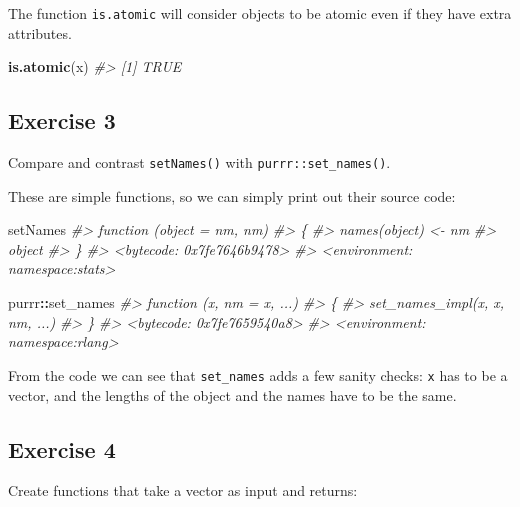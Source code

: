 \documentclass[]{book}
\newenvironment{Shaded}{\begin{snugshade}}{\end{snugshade}}
\newcommand{\CommentTok}[1]{\textcolor[rgb]{0.56,0.35,0.01}{\textit{#1}}}
\newcommand{\KeywordTok}[1]{\textcolor[rgb]{0.13,0.29,0.53}{\textbf{#1}}}
\newcommand{\NormalTok}[1]{#1}
\newcommand{\OperatorTok}[1]{\textcolor[rgb]{0.81,0.36,0.00}{\textbf{#1}}}
\theoremstyle{definition}
\theoremstyle{definition}
\theoremstyle{definition}
\theoremstyle{remark}
\begin{document}
The function \texttt{is.atomic} will consider objects to be atomic even
if they have extra attributes.

\begin{Shaded}
\begin{Highlighting}[]
\KeywordTok{is.atomic}\NormalTok{(x)}
\CommentTok{#> [1] TRUE}
\end{Highlighting}
\end{Shaded}

\hypertarget{exercise-3-36}{%
\subsection{Exercise 3}\label{exercise-3-36}}

Compare and contrast \texttt{setNames()} with
\texttt{purrr::set\_names()}.

These are simple functions, so we can simply print out their source
code:

\begin{Shaded}
\begin{Highlighting}[]
\NormalTok{setNames}
\CommentTok{#> function (object = nm, nm) }
\CommentTok{#> \{}
\CommentTok{#>     names(object) <- nm}
\CommentTok{#>     object}
\CommentTok{#> \}}
\CommentTok{#> <bytecode: 0x7fe7646b9478>}
\CommentTok{#> <environment: namespace:stats>}
\end{Highlighting}
\end{Shaded}

\begin{Shaded}
\begin{Highlighting}[]
\NormalTok{purrr}\OperatorTok{::}\NormalTok{set_names}
\CommentTok{#> function (x, nm = x, ...) }
\CommentTok{#> \{}
\CommentTok{#>     set_names_impl(x, x, nm, ...)}
\CommentTok{#> \}}
\CommentTok{#> <bytecode: 0x7fe7659540a8>}
\CommentTok{#> <environment: namespace:rlang>}
\end{Highlighting}
\end{Shaded}

From the code we can see that \texttt{set\_names} adds a few sanity
checks: \texttt{x} has to be a vector, and the lengths of the object and
the names have to be the same.

\hypertarget{exercise-4-29}{%
\subsection{Exercise 4}\label{exercise-4-29}}

Create functions that take a vector as input and returns:
\end{document}
